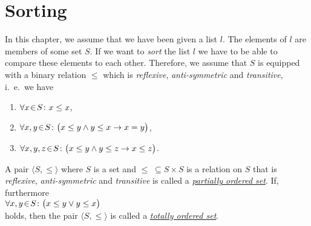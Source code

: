 \chapter{Sorting}
In this chapter, we assume that we have been given a list $l$.  The elements of $l$ are members of
some set $S$.  If we want to \emph{sort} the list $l$ we have to be able to compare these elements
to each other.   Therefore, we assume that $S$ is equipped with a binary relation $\leq$ which is
\emph{reflexive}, \emph{anti-symmetric} and \emph{transitive}, i.~e.~we have  
\begin{enumerate}
\item $\forall x \!\in\! S \colon x \leq x$,
\item $\forall x, y \!\in\! S \colon \bigl(x \leq y \wedge y \leq x
  \rightarrow x = y\bigr)$, 
\item $\forall x, y, z \!\in\! S \colon \bigl(x \leq y \wedge y \leq z \rightarrow x \leq z\bigr)$. 
\end{enumerate}
A pair $\langle S, \leq \rangle$ where $S$ is a set and $\leq \;\subseteq S \times S$ is a relation
on $S$ that is \emph{reflexive}, \emph{anti-symmetric} and \emph{transitive} is called a
\href{http://en.wikipedia.org/wiki/Partially_ordered_set}{\emph{partially ordered set}}.  
If, furthermore
\\[0.2cm]
\hspace*{1.3cm}
$\forall x, y \!\in\! S \colon\bigl( x \leq y \vee y \leq x\bigr)$
\\[0.2cm]
holds, then the pair $\langle S, \leq \rangle$ is called a 
\href{http://en.wikipedia.org/wiki/Totally_ordered_set}{\emph{totally ordered set}}.


